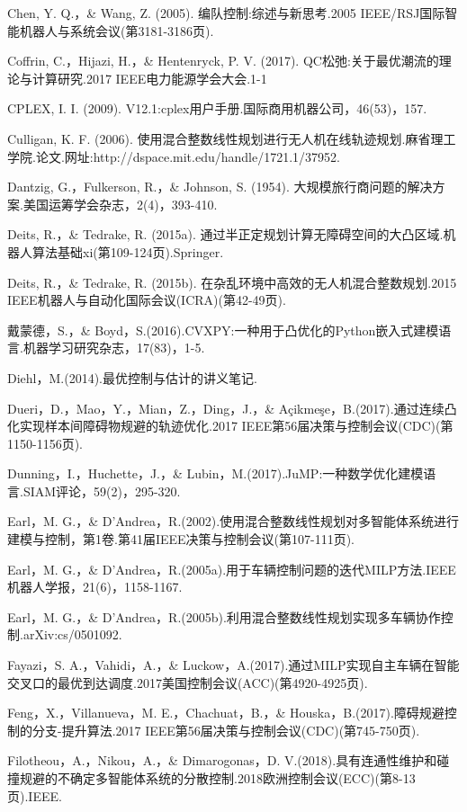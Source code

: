 \documentclass[10pt]{article}
\begin{document}
Chen, Y. Q.，\& Wang, Z. (2005). 编队控制:综述与新思考.2005 IEEE/RSJ国际智能机器人与系统会议(第3181-3186页).

Coffrin, C.，Hijazi, H.，\& Hentenryck, P. V. (2017). QC松弛:关于最优潮流的理论与计算研究.2017 IEEE电力能源学会大会.1-1

CPLEX, I. I. (2009). V12.1:cplex用户手册.国际商用机器公司，46(53)，157.

Culligan, K. F. (2006). 使用混合整数线性规划进行无人机在线轨迹规划.麻省理工学院.论文.网址:http://dspace.mit.edu/handle/1721.1/37952.

Dantzig, G.，Fulkerson, R.，\& Johnson, S. (1954). 大规模旅行商问题的解决方案.美国运筹学会杂志，2(4)，393-410.

Deits, R.，\& Tedrake, R. (2015a). 通过半正定规划计算无障碍空间的大凸区域.机器人算法基础xi(第109-124页).Springer.

Deits, R.，\& Tedrake, R. (2015b). 在杂乱环境中高效的无人机混合整数规划.2015 IEEE机器人与自动化国际会议(ICRA)(第42-49页).

戴蒙德，S.，\& Boyd，S.(2016).CVXPY:一种用于凸优化的Python嵌入式建模语言.机器学习研究杂志，17(83)，1-5.

Diehl，M.(2014).最优控制与估计的讲义笔记.

Dueri，D.，Mao，Y.，Mian，Z.，Ding，J.，\& Açikmeşe，B.(2017).通过连续凸化实现样本间障碍物规避的轨迹优化.2017 IEEE第56届决策与控制会议(CDC)(第1150-1156页).

Dunning，I.，Huchette，J.，\& Lubin，M.(2017).JuMP:一种数学优化建模语言.SIAM评论，59(2)，295-320.

Earl，M. G.，\& D'Andrea，R.(2002).使用混合整数线性规划对多智能体系统进行建模与控制，第1卷.第41届IEEE决策与控制会议(第107-111页).

Earl，M. G.，\& D'Andrea，R.(2005a).用于车辆控制问题的迭代MILP方法.IEEE机器人学报，21(6)，1158-1167.

Earl，M. G.，\& D'Andrea，R.(2005b).利用混合整数线性规划实现多车辆协作控制.arXiv:cs/0501092.

Fayazi，S. A.，Vahidi，A.，\& Luckow，A.(2017).通过MILP实现自主车辆在智能交叉口的最优到达调度.2017美国控制会议(ACC)(第4920-4925页).

Feng，X.，Villanueva，M. E.，Chachuat，B.，\& Houska，B.(2017).障碍规避控制的分支-提升算法.2017 IEEE第56届决策与控制会议(CDC)(第745-750页).

Filotheou，A.，Nikou，A.，\& Dimarogonas，D. V.(2018).具有连通性维护和碰撞规避的不确定多智能体系统的分散控制.2018欧洲控制会议(ECC)(第8-13页).IEEE.
\end{document}
